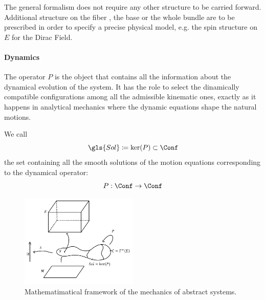 \documentclass[Main]{subfiles}
\begin{document}
	\begin{observation}
	 	The general formalism does not require any other structure to be carried forward.
	 	Additional structure on the fiber , the base or the whole bundle are to be prescribed in order to specify a precise physical model, e.g. the spin structure on $E$ for the Dirac Field.\cite{Benini}
	 \end{observation}	
	
	\paragraph{Dynamics}
	The operator $P$ is the object that contains all the information about the dynamical evolution of the system.
	It has the role to select the dinamically compatible configurations among all the admissible kinematic ones, exactly as it happens in analytical mechanics where the dynamic equations shape the natural motions.
	\begin{definition}\label{Def:SolSpace}
		We call
		\begin{displaymath}
			\gls{Sol} \coloneqq \ker(P) \subset \Conf
		\end{displaymath}
		the set containing all the smooth solutions of the motion equations corresponding to the  dynamical operator:	
		\begin{displaymath}
			P: \Conf \rightarrow \Conf
		\end{displaymath}
	\end{definition}
	
	\begin{figure}[h!]
		\centering
		\includegraphics[width=0.5\textwidth]{Pictures/AbstractFieldTheory} 
		 	 	\caption{Mathematimatical framework of the mechanics of abstract systems. }
	\end{figure}	
	
\end{document}
